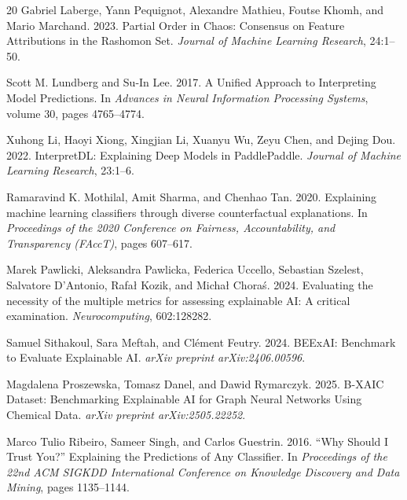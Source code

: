 \documentclass[twoside,11pt]{article}
\begin{document}
\begin{thebibliography}{20}
Gabriel Laberge, Yann Pequignot, Alexandre Mathieu, Foutse Khomh, and Mario Marchand.
2023.
Partial Order in Chaos: Consensus on Feature Attributions in the Rashomon Set.
\emph{Journal of Machine Learning Research}, 24:1--50.

Scott M. Lundberg and Su-In Lee.
2017.
A Unified Approach to Interpreting Model Predictions.
In \emph{Advances in Neural Information Processing Systems}, volume 30,
pages 4765--4774.

Xuhong Li, Haoyi Xiong, Xingjian Li, Xuanyu Wu, Zeyu Chen, and Dejing Dou.
2022.
InterpretDL: Explaining Deep Models in PaddlePaddle.
\emph{Journal of Machine Learning Research}, 23:1--6.

Ramaravind K. Mothilal, Amit Sharma, and Chenhao Tan.
2020.
Explaining machine learning classifiers through diverse counterfactual explanations.
In \emph{Proceedings of the 2020 Conference on Fairness, Accountability, and Transparency (FAccT)},
pages 607--617.

Marek Pawlicki, Aleksandra Pawlicka, Federica Uccello, Sebastian Szelest,
Salvatore D'Antonio, Rafa{\l} Kozik, and Micha{\l} Chora\'s.
2024.
Evaluating the necessity of the multiple metrics for assessing explainable AI: A critical examination.
\emph{Neurocomputing}, 602:128282.

Samuel Sithakoul, Sara Meftah, and Cl\'ement Feutry.
2024.
BEExAI: Benchmark to Evaluate Explainable AI.
\emph{arXiv preprint arXiv:2406.00596}.

Magdalena Proszewska, Tomasz Danel, and Dawid Rymarczyk.
2025.
B-XAIC Dataset: Benchmarking Explainable AI for Graph Neural Networks Using Chemical Data.
\emph{arXiv preprint arXiv:2505.22252}.

Marco Tulio Ribeiro, Sameer Singh, and Carlos Guestrin.
2016.
``Why Should I Trust You?'' Explaining the Predictions of Any Classifier.
In \emph{Proceedings of the 22nd ACM SIGKDD International Conference on Knowledge Discovery and Data Mining},
pages 1135--1144.


\end{thebibliography}
\end{document}
